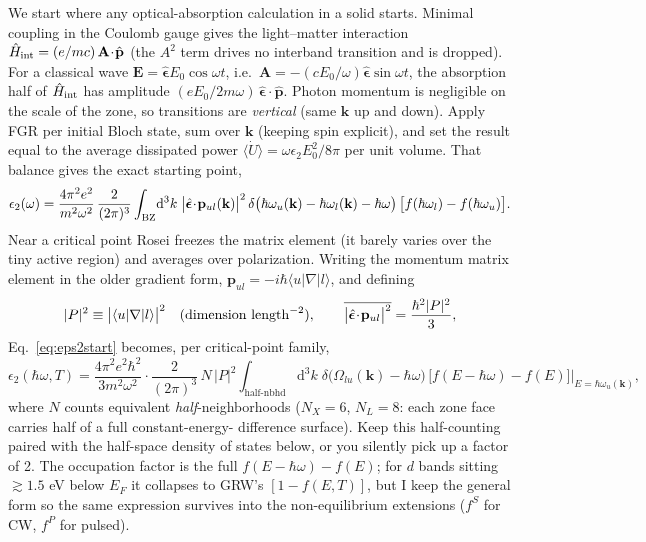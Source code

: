 \documentclass[11pt,a4paper]{article}
\numberwithin{equation}{section}
\newcommand{\hw}{\hbar\omega}
\newcommand{\dd}{\mathrm{d}}
\begin{document}
We start where any optical-absorption calculation in a solid starts.
Minimal coupling in the Coulomb gauge gives the light--matter
interaction $\hat H_{\rm int}=(e/mc)\,\mathbf A\!\cdot\!\hat{\mathbf p}$
(the $A^2$ term drives no interband transition and is dropped). For a
classical wave $\mathbf E=\hat{\bm\epsilon}E_0\cos\omega t$, i.e.\
$\mathbf A=-(cE_0/\omega)\hat{\bm\epsilon}\sin\omega t$, the
absorption half of $\hat H_{\rm int}$ has amplitude
$(eE_0/2m\omega)\,\hat{\bm\epsilon}\!\cdot\!\hat{\mathbf p}$. Photon
momentum is negligible on the scale of the zone, so transitions are
\emph{vertical} (same $\mathbf k$ up and down). Apply FGR per initial
Bloch state, sum over $\mathbf k$ (keeping spin explicit), and set the
result equal to the average dissipated power
$\langle\dot U\rangle=\omega\epsilon_2E_0^2/8\pi$ per unit volume.
That balance gives the exact starting point,
\begin{equation}
\epsilon_2(\omega)=\frac{4\pi^2e^2}{m^2\omega^2}\,
\frac{2}{(2\pi)^3}\int_{\rm BZ}\!\dd^3k\;
\bigl|\hat{\bm\epsilon}\!\cdot\!\mathbf p_{ul}(\mathbf k)\bigr|^{2}
\,\delta\bigl(\hbar\omega_u(\mathbf k)-\hbar\omega_l(\mathbf k)-\hw\bigr)
\,\bigl[f(\hbar\omega_l)-f(\hbar\omega_u)\bigr].
\label{eq:eps2start}
\end{equation}
Near a critical point Rosei freezes the matrix element (it barely
varies over the tiny active region) and averages over polarization.
Writing the momentum matrix element in the older gradient form,
$\mathbf p_{ul}=-i\hbar\langle u|\nabla|l\rangle$, and defining
\begin{equation}
|P|^2\equiv\bigl|\langle u|\nabla|l\rangle\bigr|^2
\quad(\text{dimension }{\rm length}^{-2}),
\qquad
\overline{\bigl|\hat{\bm\epsilon}\!\cdot\!\mathbf p_{ul}\bigr|^2}
=\frac{\hbar^2|P|^2}{3},
\label{eq:Pconvention}
\end{equation}
Eq.~\eqref{eq:eps2start} becomes, per critical-point family,
\begin{equation}
\epsilon_2(\hw,T)=\frac{4\pi^2e^2\hbar^2}{3m^2\omega^2}\cdot
\frac{2}{(2\pi)^3}\,N\,|P|^2
\int_{\text{half-nbhd}}\!\dd^3k\;
\delta\bigl(\Omega_{lu}(\mathbf k)-\hw\bigr)\,
\bigl[f(E-\hw)-f(E)\bigr]\Big|_{E=\hbar\omega_u(\mathbf k)} ,
\label{eq:eps2CP}
\end{equation}
where $N$ counts equivalent \emph{half}-neighborhoods ($N_X=6$,
$N_L=8$: each zone face carries half of a full constant-energy-
difference surface). Keep this half-counting paired with the
half-space density of states below, or you silently pick up a factor
of 2. The occupation factor is the full $f(E-\hw)-f(E)$; for $d$ bands
sitting $\gtrsim1.5$ eV below $E_F$ it collapses to GRW's
$[1-f(E,T)]$, but I keep the general form so the same expression
survives into the non-equilibrium extensions ($f^S$ for CW, $f^P$ for
pulsed).
\end{document}

